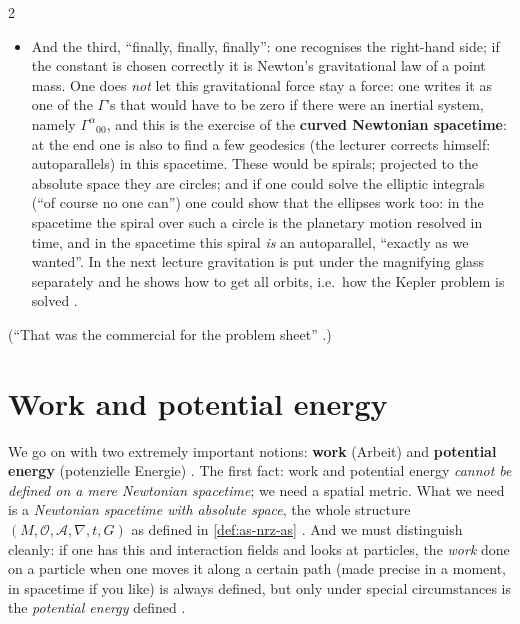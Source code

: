 \begin{paracol}{2}
\begin{itemize}
  \item And the third, ``finally, finally, finally'': one recognises the right-hand side; if the constant is chosen correctly it is Newton's gravitational law of a point mass. One does \emph{not} let this gravitational force stay a force: one writes it as one of the $\Gamma$'s that would have to be zero if there were an inertial system,
        namely $\Gamma^\alpha{}_{00}$, and this is the exercise of the \textbf{curved Newtonian spacetime}: at the end one is also to find a few geodesics (the lecturer corrects himself: autoparallels) in this spacetime. These would be spirals; projected to the absolute space they are circles; and if one could solve the elliptic integrals (``of course no one can'') one could
        show that the ellipses work too: in the spacetime the spiral over such a circle is the planetary motion resolved in time, and in the spacetime this spiral \emph{is} an autoparallel, ``exactly as we wanted''. In the next lecture gravitation is put under the magnifying glass separately and he shows how to get all orbits, i.e.\ how the Kepler problem is solved .
\end{itemize}
(``That was the commercial for the problem sheet'' .)

\section{Work and potential energy}\label{sec:nd-work}

We go on with two extremely important notions: \textbf{work} (Arbeit) and \textbf{potential energy} (potenzielle Energie) . The first fact: work and potential energy \emph{cannot be defined on a mere Newtonian spacetime}; we need a spatial metric. What we need is a
\emph{Newtonian spacetime with absolute space}, the whole structure $(M,\mathcal O,\mathcal A,\nabla,t,G)$ as defined in \cref{def:as-nrz-as} . And we must distinguish cleanly: if one has this and interaction fields and looks at particles, the \emph{work} done on a particle when one moves it along a certain
path (made precise in a moment, in spacetime if you like) is always defined, but only under special circumstances is the \emph{potential energy} defined .


\end{paracol}
